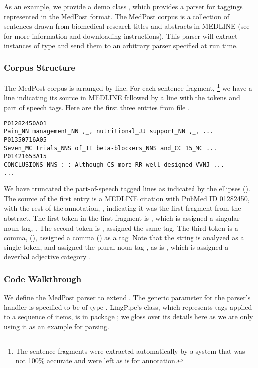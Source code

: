 As an example, we provide a demo class , which
provides a parser for taggings represented in the MedPost format.  The
MedPost corpus is a collection of sentences drawn from biomedical
research titles and abstracts in MEDLINE (see 
for more information and downloading instructions).  This parser will
extract instances of type  and send them
to an arbitrary parser specified at run time.

\subsubsection{Corpus Structure}

The MedPost corpus is arranged by line.  For each sentence fragment,
%
\footnote{The sentence fragments were extracted automatically by a
  system that was not 100\% accurate and were left as is for
  annotation.}
%
we have a line indicating its source in MEDLINE followed by a line
with the tokens and part of speech tags.   Here are the first
three entries from file .
%
\begin{verbatim}
P01282450A01
Pain_NN management_NN ,_, nutritional_JJ support_NN ,_, ...
P01350716A05
Seven_MC trials_NNS of_II beta-blockers_NNS and_CC 15_MC ...
P01421653A15
CONCLUSIONS_NNS :_: Although_CS more_RR well-designed_VVNJ ...
...
\end{verbatim}
%
We have truncated the part-of-speech tagged lines as indicated by the
ellipses ().  The source of the first entry is a MEDLINE
citation with PubMed ID 01282450, with the rest of the annotation,
, indicating it was the first fragment from the abstract.
The first token in the first fragment is , which
is assigned a singular noun tag, .  The second token is
, assigned the same tag.  The third token is
a comma, (\stringmention{,}), assigned a comma (\code{,}) as a
tag. Note that the string  is analyzed as
a single token, and assigned the plural noun tag , as is
, which is assigned a deverbal adjective
category .


\subsubsection{Code Walkthrough}

We define the MedPost parser to extend .
%
%
The generic parameter for the parser's handler is specified to be of
type .  LingPipe's 
class, which represents tags applied to a sequence of items, is in
package ; we gloss over its details here as we
are only using it as an example for parsing.

